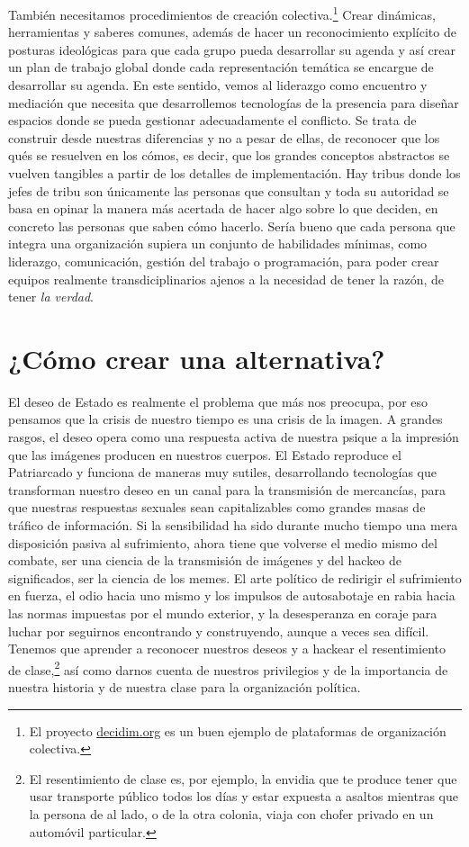 También necesitamos procedimientos de creación colectiva.\footnote{El proyecto \url{decidim.org} es un buen ejemplo de plataformas de organización colectiva.} Crear dinámicas, herramientas y saberes comunes, además de hacer un reconocimiento explícito de posturas ideológicas para que cada grupo pueda desarrollar su agenda y así crear un plan de trabajo global donde cada representación temática se encargue de desarrollar su agenda. En este sentido, vemos al liderazgo como encuentro y mediación que necesita que desarrollemos tecnologías de la presencia para diseñar espacios donde se pueda gestionar adecuadamente el conflicto. Se trata de construir desde nuestras diferencias y no a pesar de ellas, de reconocer que los qués se resuelven en los cómos, es decir, que los grandes conceptos abstractos se vuelven tangibles a partir de los detalles de implementación. Hay tribus donde los jefes de tribu son únicamente las personas que consultan y toda su autoridad se basa en opinar la manera más acertada de hacer algo sobre lo que deciden, en concreto las personas que saben cómo hacerlo. Sería bueno que cada persona que integra una organización supiera un conjunto de habilidades mínimas, como liderazgo, comunicación, gestión del trabajo o programación, para poder crear equipos realmente transdiciplinarios ajenos a la necesidad de tener la razón, de tener \emph{la verdad}.

\section{¿Cómo crear una alternativa?}
\label{sec:alternativa}

El deseo de Estado es realmente el problema que más nos preocupa, por eso pensamos que la crisis de nuestro tiempo es una crisis de la imagen. A grandes rasgos, el deseo opera como una respuesta activa de nuestra psique a la impresión que las imágenes producen en nuestros cuerpos. El Estado reproduce el Patriarcado y funciona de maneras muy sutiles, desarrollando tecnologías que transforman nuestro deseo en un canal para la transmisión de mercancías, para que nuestras respuestas sexuales sean capitalizables como grandes masas de tráfico de información. Si la sensibilidad ha sido durante mucho tiempo una mera disposición pasiva al sufrimiento, ahora tiene que volverse el medio mismo del combate, ser una ciencia de la transmisión de imágenes y del hackeo de significados, ser la ciencia de los memes. El arte político de redirigir el sufrimiento en fuerza, el odio hacia uno mismo y los impulsos de autosabotaje en rabia hacia las normas impuestas por el mundo exterior, y la desesperanza en coraje para luchar por seguirnos encontrando y construyendo, aunque a veces sea difícil. Tenemos que aprender a reconocer nuestros deseos y a hackear el resentimiento de clase,\footnote{El resentimiento de clase es, por ejemplo, la envidia que te produce tener que usar transporte público todos los días y estar expuesta a asaltos mientras que la persona de al lado, o de la otra colonia, viaja con chofer privado en un automóvil particular.} así como darnos cuenta de nuestros privilegios y de la importancia de nuestra historia y de nuestra clase para la organización política.

